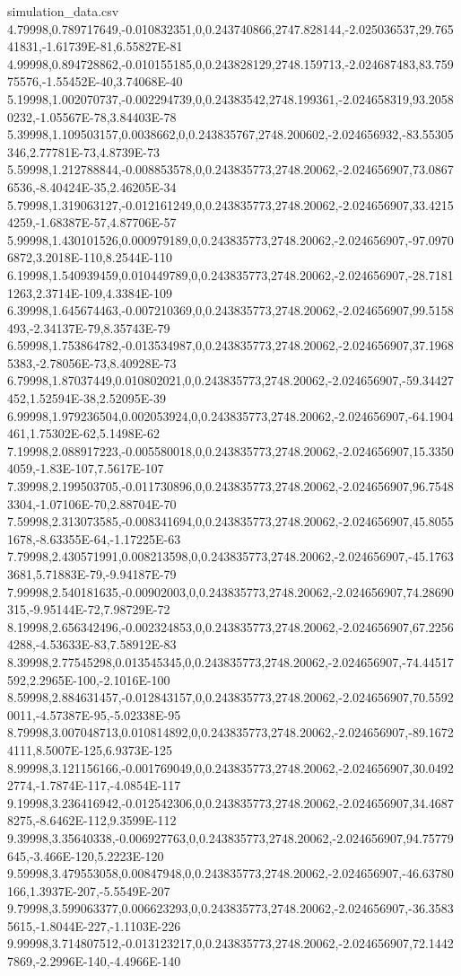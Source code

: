 \begin{filecontents}{simulation_data.csv}
4.79998,0.789717649,-0.010832351,0,0.243740866,2747.828144,-2.025036537,29.76541831,-1.61739E-81,6.55827E-81
4.99998,0.894728862,-0.010155185,0,0.243828129,2748.159713,-2.024687483,83.75975576,-1.55452E-40,3.74068E-40
5.19998,1.002070737,-0.002294739,0,0.24383542,2748.199361,-2.024658319,93.20580232,-1.05567E-78,3.84403E-78
5.39998,1.109503157,0.0038662,0,0.243835767,2748.200602,-2.024656932,-83.55305346,2.77781E-73,4.8739E-73
5.59998,1.212788844,-0.008853578,0,0.243835773,2748.20062,-2.024656907,73.08676536,-8.40424E-35,2.46205E-34
5.79998,1.319063127,-0.012161249,0,0.243835773,2748.20062,-2.024656907,33.42154259,-1.68387E-57,4.87706E-57
5.99998,1.430101526,0.000979189,0,0.243835773,2748.20062,-2.024656907,-97.09706872,3.2018E-110,8.2544E-110
6.19998,1.540939459,0.010449789,0,0.243835773,2748.20062,-2.024656907,-28.71811263,2.3714E-109,4.3384E-109
6.39998,1.645674463,-0.007210369,0,0.243835773,2748.20062,-2.024656907,99.5158493,-2.34137E-79,8.35743E-79
6.59998,1.753864782,-0.013534987,0,0.243835773,2748.20062,-2.024656907,37.19685383,-2.78056E-73,8.40928E-73
6.79998,1.87037449,0.010802021,0,0.243835773,2748.20062,-2.024656907,-59.34427452,1.52594E-38,2.52095E-39
6.99998,1.979236504,0.002053924,0,0.243835773,2748.20062,-2.024656907,-64.1904461,1.75302E-62,5.1498E-62
7.19998,2.088917223,-0.005580018,0,0.243835773,2748.20062,-2.024656907,15.33504059,-1.83E-107,7.5617E-107
7.39998,2.199503705,-0.011730896,0,0.243835773,2748.20062,-2.024656907,96.75483304,-1.07106E-70,2.88704E-70
7.59998,2.313073585,-0.008341694,0,0.243835773,2748.20062,-2.024656907,45.80551678,-8.63355E-64,-1.17225E-63
7.79998,2.430571991,0.008213598,0,0.243835773,2748.20062,-2.024656907,-45.17633681,5.71883E-79,-9.94187E-79
7.99998,2.540181635,-0.00902003,0,0.243835773,2748.20062,-2.024656907,74.28690315,-9.95144E-72,7.98729E-72
8.19998,2.656342496,-0.002324853,0,0.243835773,2748.20062,-2.024656907,67.22564288,-4.53633E-83,7.58912E-83
8.39998,2.77545298,0.013545345,0,0.243835773,2748.20062,-2.024656907,-74.44517592,2.2965E-100,-2.1016E-100
8.59998,2.884631457,-0.012843157,0,0.243835773,2748.20062,-2.024656907,70.55920011,-4.57387E-95,-5.02338E-95
8.79998,3.007048713,0.010814892,0,0.243835773,2748.20062,-2.024656907,-89.16724111,8.5007E-125,6.9373E-125
8.99998,3.121156166,-0.001769049,0,0.243835773,2748.20062,-2.024656907,30.04922774,-1.7874E-117,-4.0854E-117
9.19998,3.236416942,-0.012542306,0,0.243835773,2748.20062,-2.024656907,34.46878275,-8.6462E-112,9.3599E-112
9.39998,3.35640338,-0.006927763,0,0.243835773,2748.20062,-2.024656907,94.75779645,-3.466E-120,5.2223E-120
9.59998,3.479553058,0.00847948,0,0.243835773,2748.20062,-2.024656907,-46.63780166,1.3937E-207,-5.5549E-207
9.79998,3.599063377,0.006623293,0,0.243835773,2748.20062,-2.024656907,-36.35835615,-1.8044E-227,-1.1103E-226
9.99998,3.714807512,-0.013123217,0,0.243835773,2748.20062,-2.024656907,72.14427869,-2.2996E-140,-4.4966E-140
\end{filecontents}

